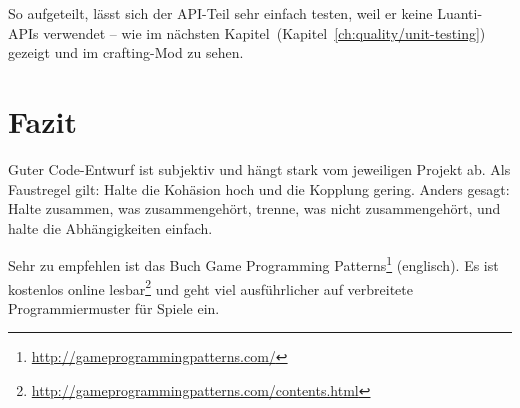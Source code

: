So aufgeteilt, lässt sich der API-Teil sehr einfach testen, weil er
keine Luanti-APIs verwendet -- wie im nächsten
Kapitel~(Kapitel~\ref{ch:quality/unit-testing}) gezeigt und im
crafting-Mod zu sehen.

\section{Fazit}\label{fazit}

Guter Code-Entwurf ist subjektiv und hängt stark vom jeweiligen Projekt
ab. Als Faustregel gilt: Halte die Kohäsion hoch und die Kopplung
gering. Anders gesagt: Halte zusammen, was zusammengehört, trenne, was
nicht zusammengehört, und halte die Abhängigkeiten einfach.

Sehr zu empfehlen ist das Buch Game Programming Patterns\footnote{\url{http://gameprogrammingpatterns.com/}}
(englisch). Es ist kostenlos online lesbar\footnote{\url{http://gameprogrammingpatterns.com/contents.html}}
und geht viel ausführlicher auf verbreitete Programmiermuster für Spiele
ein.
